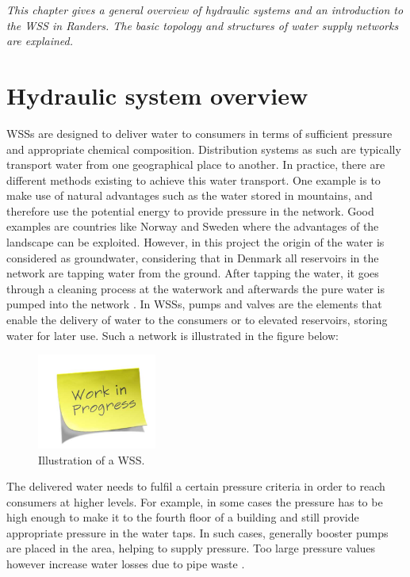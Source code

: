 \emph{This chapter gives a general overview of hydraulic systems and an introduction to the WSS in Randers. The basic topology and structures of water supply networks are explained. }

\section{Hydraulic system overview}
\label{hydraulic_system_overview}

WSSs are designed to deliver water to consumers in terms of sufficient pressure and appropriate chemical composition. Distribution systems as such are typically transport water from one geographical place to another. In practice, there are different methods existing to achieve this water transport. One example is to make use of natural advantages such as the water stored in mountains, and therefore use the potential energy to provide pressure in the network. Good examples are countries like Norway and Sweden where the advantages of the landscape can be exploited. However, in this project the origin of the water is considered as groundwater, considering that in Denmark all reservoirs in the network are tapping water from the ground. After tapping the water, it goes through a cleaning process at the waterwork and afterwards the pure water is pumped into the network \cite{prahata}. In WSSs, pumps and valves are the elements that enable the delivery of water to the consumers or to elevated reservoirs, storing water for later use. Such a network is illustrated in the figure below: 

\begin{figure}[H]
\centering
\includegraphics[width=0.35\textwidth]{report/pictures/missingfigure}
\caption{Illustration of a WSS.}
\label{fig:WSS_example}
\end{figure}

The delivered water needs to fulfil a certain pressure criteria in order to reach consumers at higher levels. For example, in some cases the pressure has to be high enough to make it to the fourth floor of a building and still provide appropriate pressure in the water taps. In such cases, generally booster pumps are placed in the area, helping to supply pressure. Too large pressure values however  increase water losses due to pipe waste \cite{walski2003advanced}.

